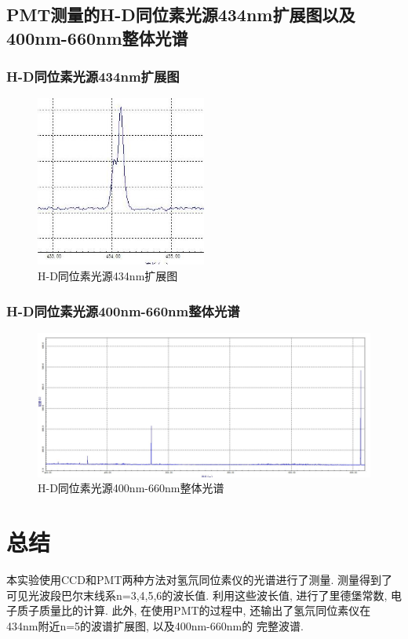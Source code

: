\documentclass[12pt,a4paper]{article}
\begin{document}
\subsection{PMT测量的H-D同位素光源434nm扩展图以及400nm-660nm整体光谱}
\subsubsection{H-D同位素光源434nm扩展图}
\begin{figure}[H]
    \centering
    \includegraphics[width=0.5\textwidth]{HD434_2.JPG}
    \caption{H-D同位素光源434nm扩展图}
\end{figure}

\subsubsection{H-D同位素光源400nm-660nm整体光谱}
\begin{figure}[H]
    \centering
    \includegraphics[width=1.35\textwidth,angle=-90]{HDALL3.JPG}
    \caption{H-D同位素光源400nm-660nm整体光谱}
\end{figure}


\section{总结}
本实验使用CCD和PMT两种方法对氢氘同位素仪的光谱进行了测量. 测量得到了可见光波段巴尔末线系n=3,4,5,6的波长值. 
利用这些波长值, 进行了里德堡常数, 电子质子质量比的计算. 此外, 在使用PMT的过程中, 还输出了氢氘同位素仪在434nm附近n=5的波谱扩展图, 以及400nm-660nm的
完整波谱. 
\end{document}
